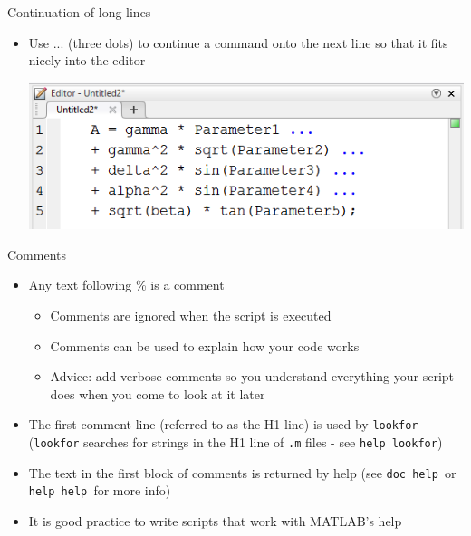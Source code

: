 \documentclass{beamer}
\begin{document}
\begin{frame}{Continuation of long lines}
	\begin{itemize}
		\item Use ... (three dots) to continue a command onto the next line so that it fits nicely into the editor
		
		
		\includegraphics[scale=0.7]{editor_line_continuation}
	\end{itemize}
\end{frame}

\begin{frame}{Comments}
	\begin{itemize}
		\item Any text following \% is a comment
		\begin{itemize}
			\item Comments are ignored when the script is executed
			\item Comments can be used to explain how your code works
			\item Advice: add verbose comments so you understand everything your script does when you come to look at it later
		\end{itemize}
		\item The first comment line (referred to as the H1 line) is used by \texttt{lookfor} (\texttt{lookfor} searches for strings in the H1 line of \texttt{.m} files - see \texttt{help lookfor})
		\item The text in the first block of comments is returned by help (see \texttt{doc help }or \texttt{help help }for more info)
		\item It is good practice to write scripts that work with MATLAB's help
		
		
	\end{itemize}
\end{frame}
\end{document}
